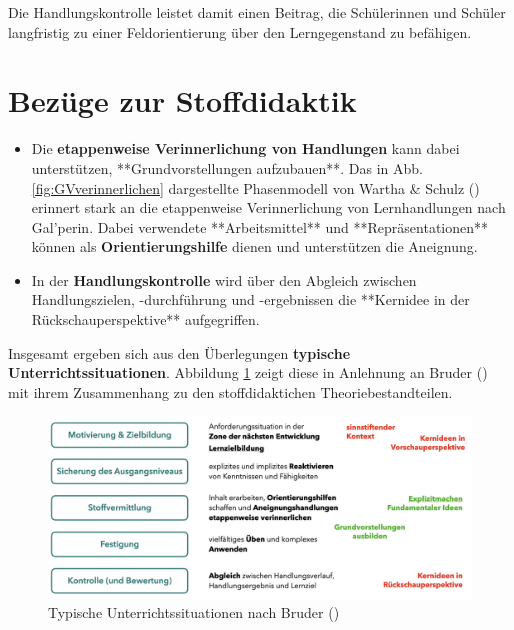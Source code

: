 \documentclass[
]{scrbook}
\theoremstyle{definition}
\theoremstyle{definition}
\theoremstyle{definition}
\theoremstyle{definition}
\theoremstyle{remark}
\begin{document}
Die Handlungskontrolle leistet damit einen Beitrag, die Schülerinnen und Schüler langfristig zu einer Feldorientierung über den Lerngegenstand zu befähigen.

\section{Bezüge zur Stoffdidaktik}\label{bezuege-zur-stoffdidaktik-lernhandlungen}

\begin{itemize}
\item
  Die \textbf{etappenweise Verinnerlichung von Handlungen} kann dabei unterstützen, \textcolor{semanticColor}{**Grundvorstellungen aufzubauen**}. Das in Abb. \ref{fig:GVverinnerlichen} dargestellte Phasenmodell von Wartha \& Schulz () erinnert stark an die etappenweise Verinnerlichung von Lernhandlungen nach Gal'perin. Dabei verwendete \textcolor{semanticColor}{**Arbeitsmittel**} und \textcolor{semanticColor}{**Repräsentationen**} können als \textbf{Orientierungshilfe} dienen und unterstützen die Aneignung.
\item
  In der \textbf{Handlungskontrolle} wird über den Abgleich zwischen Handlungszielen, -durchführung und -ergebnissen die \textcolor{concreteColor}{**Kernidee in der Rückschauperspektive**} aufgegriffen.
\end{itemize}

Insgesamt ergeben sich aus den Überlegungen \textbf{typische Unterrichtssituationen}. Abbildung \ref{fig:Unterrichtsphasen} zeigt diese in Anlehnung an Bruder () mit ihrem Zusammenhang zu den stoffdidaktichen Theoriebestandteilen.



\begin{figure}

{\centering \includegraphics[width=0.95\linewidth]{pictures/6-Unterrichtssituationen} 

}

\caption{Typische Unterrichtssituationen nach Bruder ()}\label{fig:Unterrichtsphasen}
\end{figure}
\end{document}
